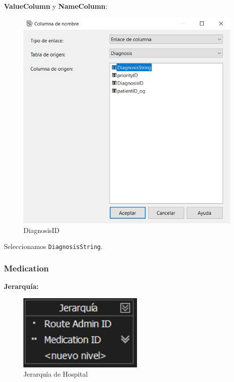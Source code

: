 \documentclass[12pt, a4paper, twoside]{article}
\begin{document}
\textbf{ValueColumn} y \textbf{NameColumn}:

\begin{figure}[H]
	\centering
	\includegraphics[width=1\textwidth]{image/DiagnosisID}
	\caption{DiagnosisID}
	\label{fig:21}
\end{figure}

Seleccionamos \texttt{DiagnosisString}.

\subsubsection{Medication}

\textbf{Jerarquía:}

\begin{figure}[H]
	\centering
	\includegraphics[width=0.55\textwidth]{image/JMedication}
	\caption{Jerarquía de Hospital}
	\label{fig:22}
\end{figure}
\end{document}
